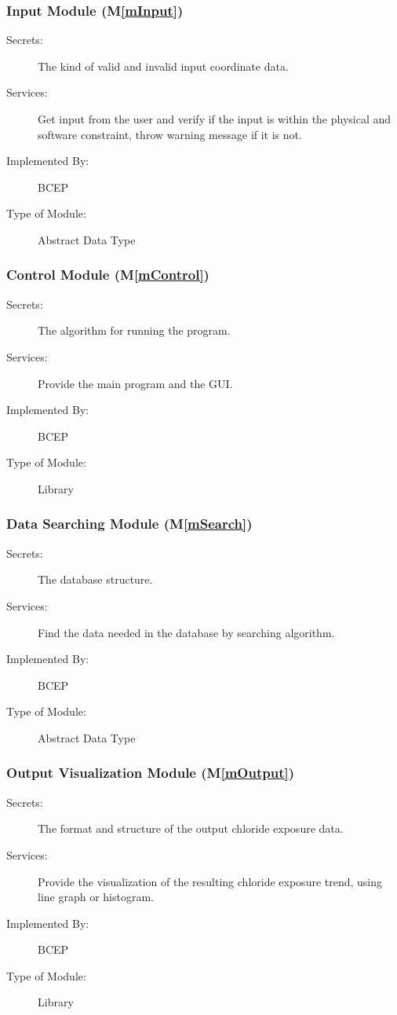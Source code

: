 \documentclass[12pt, titlepage]{article}
\newcommand{\mref}[1]{M\ref{#1}}
\begin{document}
\subsubsection{Input Module (\mref{mInput})}

\begin{description}
\item[Secrets:] The kind of valid and invalid input coordinate data. 
\item[Services:] Get input from the user and verify if the input is within the physical and software constraint, throw warning message if it is not. 
\item[Implemented By:] BCEP
\item[Type of Module:] Abstract Data Type
\end{description}


\subsubsection{Control Module (\mref{mControl})}
\begin{description}
\item[Secrets:] The algorithm for running the program.
\item[Services:] Provide the main program and the GUI.
\item[Implemented By:] BCEP
\item[Type of Module:] Library
\end{description}

\subsubsection{Data Searching Module (\mref{mSearch})}
\begin{description}
\item[Secrets:] The database structure.
\item[Services:] Find the data needed in the database by searching algorithm.
\item[Implemented By:] BCEP
\item[Type of Module:] Abstract Data Type
\end{description}

\subsubsection{Output Visualization Module (\mref{mOutput})}
\begin{description}
\item[Secrets:] The format and structure of the output chloride exposure data.
\item[Services:] Provide the visualization of the resulting chloride exposure trend, using line graph or histogram. 
\item[Implemented By:] BCEP
\item[Type of Module:] Library
\end{description}
\end{document}
